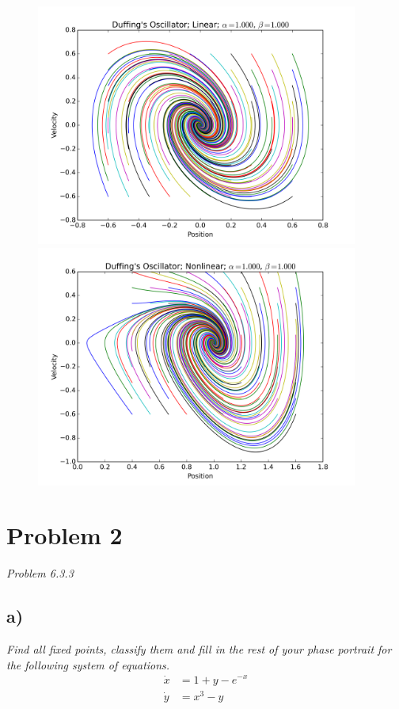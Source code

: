 \documentclass[12pt]{article}
\begin{document}
\begin{figure}[ht]
    \centering
    \includegraphics[width=400px]{figures/1_d_Duffing's_Oscillator_linear}
    \includegraphics[width=400px]{figures/1_d_Duffing's_Oscillator_nonlinear}
\end{figure}

\FloatBarrier
\section*{Problem 2}
\emph{Problem 6.3.3}

\subsection*{ a)}
\emph{Find all fixed points, classify them and fill in the rest of your phase portrait for the following system of equations.}
\begin{align*}
	\dot{x} &= 1 + y - e^{-x} \\
	\dot{y} &= x^3 - y
\end{align*}
\end{document}
